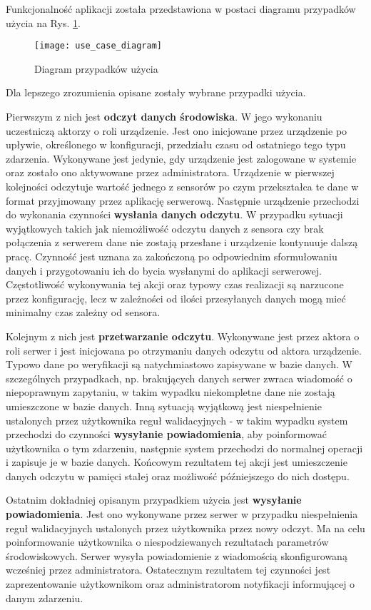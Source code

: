 Funkcjonalność aplikacji została przedstawiona w postaci diagramu przypadków użycia na Rys. \ref{uml:use_case}.
\begin{figure}[h!]
  \centering
  \texttt{[image: use\_case\_diagram]}
  \caption{Diagram przypadków użycia}
  \label{uml:use_case}
\end{figure}
Dla lepszego zrozumienia opisane zostały wybrane przypadki użycia.

Pierwszym z nich jest \textbf{odczyt danych środowiska}. W jego wykonaniu uczestniczą aktorzy o roli
urządzenie. Jest ono inicjowane przez urządzenie po upływie, określonego w konfiguracji, przedziału 
czasu od ostatniego tego typu zdarzenia. Wykonywane jest jedynie, gdy urządzenie jest zalogowane w systemie
oraz zostało ono aktywowane przez administratora. Urządzenie w pierwszej kolejności odczytuje wartość
jednego z sensorów po czym przekształca te dane w format przyjmowany przez aplikację serwerową. 
Następnie urządzenie przechodzi do wykonania czynności \textbf{wysłania danych odczytu}. 
W przypadku sytuacji wyjątkowych takich jak niemożliwość odczytu danych z sensora czy brak połączenia
z serwerem dane nie zostają przesłane i urządzenie kontynuuje dalszą pracę. Czynność jest uznana
za zakończoną po odpowiednim sformułowaniu danych i przygotowaniu ich do bycia wysłanymi do aplikacji serwerowej.
Częstotliwość wykonywania tej akcji oraz typowy czas realizacji są narzucone przez konfigurację, lecz w zależności
od ilości przesyłanych danych mogą mieć minimalny czas zależny od sensora.

Kolejnym z nich jest \textbf{przetwarzanie odczytu}. Wykonywane jest przez aktora o roli serwer i jest 
inicjowana po otrzymaniu danych odczytu od aktora urządzenie. Typowo dane po weryfikacji są natychmiastowo
zapisywane w bazie danych. W szczególnych przypadkach, np. brakujących danych serwer zwraca wiadomość
o niepoprawnym zapytaniu, w takim wypadku niekompletne dane nie zostają umieszczone w bazie danych.
Inną sytuacją wyjątkową jest niespełnienie ustalonych przez użytkownika
reguł walidacyjnych - w takim wypadku system przechodzi do czynności \textbf{wysyłanie powiadomienia}, aby
poinformować użytkownika o tym zdarzeniu, następnie system przechodzi do normalnej operacji i zapisuje je
w bazie danych. Końcowym rezultatem tej akcji jest umieszczenie danych odczytu w pamięci stałej oraz
możliwość późniejszego do nich dostępu.

Ostatnim dokładniej opisanym przypadkiem użycia jest \textbf{wysyłanie powiadomienia}. Jest ono wykonywane
przez serwer w przypadku niespełnienia reguł walidacyjnych ustalonych przez użytkownika przez nowy odczyt.
Ma na celu poinformowanie użytkownika o niespodziewanych rezultatach parametrów środowiskowych.
Serwer wysyła powiadomienie z wiadomością skonfigurowaną wcześniej przez administratora. 
Ostatecznym rezultatem tej czynności jest zaprezentowanie użytkownikom oraz administratorom notyfikacji
informującej o danym zdarzeniu.

